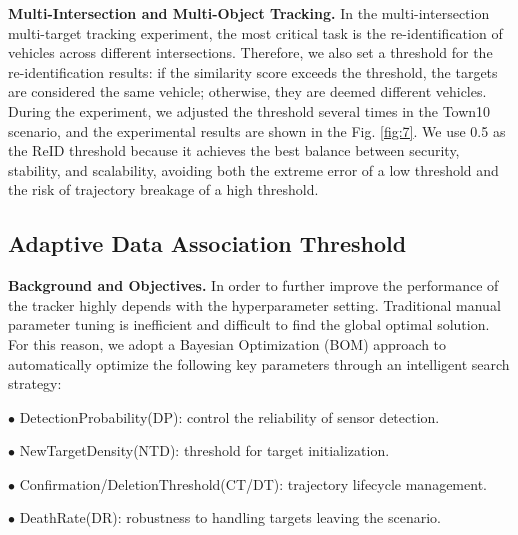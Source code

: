 \documentclass[lettersize,journal]{IEEEtran}
\begin{document}
\textbf{Multi-Intersection and Multi-Object Tracking.}
In the multi-intersection multi-target tracking experiment, the most critical task is the re-identification of vehicles across different intersections. 
Therefore, we also set a threshold for the re-identification results: if the similarity score exceeds the threshold, the targets are considered the same vehicle; otherwise, they are deemed different vehicles. 
During the experiment, we adjusted the threshold several times in the Town10 scenario, and the experimental results are shown in the Fig. \ref{fig:7}.
We use 0.5 as the ReID threshold because it achieves the best balance between security, stability, and scalability, avoiding both the extreme error of a low threshold and the risk of trajectory breakage of a high threshold.


\subsection{Adaptive Data Association Threshold}

\textbf{Background and Objectives.}
In order to further improve the performance of the tracker highly depends with the hyperparameter setting. 
Traditional manual parameter tuning is inefficient and difficult to find the global optimal solution. 
For this reason, we adopt a Bayesian Optimization (BOM) approach to automatically optimize the following key parameters through an intelligent search strategy:

\(\bullet\) DetectionProbability(DP): control the reliability of sensor detection.

\(\bullet\) NewTargetDensity(NTD): threshold for target initialization.

\(\bullet\) Confirmation/DeletionThreshold(CT/DT): trajectory lifecycle management.

\(\bullet\) DeathRate(DR): robustness to handling targets leaving the scenario.
\end{document}
